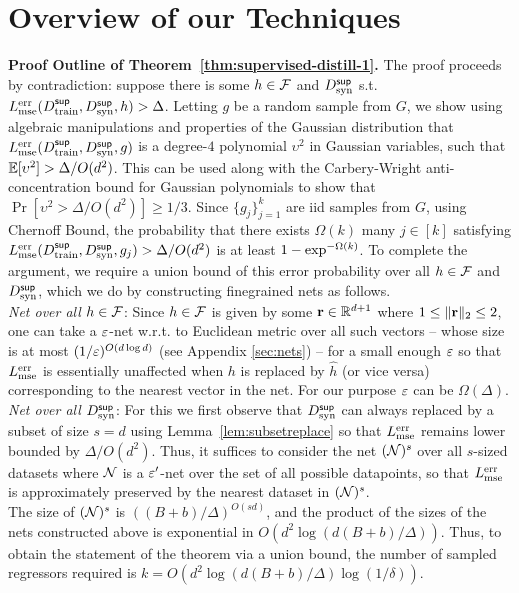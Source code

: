 \section{Overview of our Techniques}

{\bf Proof Outline of Theorem~\ref{thm:supervised-distill-1}.} The proof proceeds by contradiction: suppose there is some $h \in \mathcal{F}$ and $D^{\sf sup}_{\textnormal{syn}}$ s.t. $L^{\textnormal{err}}_{\textnormal{mse}}(D^{\sf sup}_{\textnormal{train}}, D^{\sf sup}_{\textnormal{syn}}, h) > \Delta$. Letting $g$ be a random sample from  $G$, we show  using algebraic manipulations and properties of the Gaussian distribution that  $L^{\textnormal{err}}_{\textnormal{mse}}(D^{\sf sup}_{\textnormal{train}}, D^{\sf sup}_{\textnormal{syn}}, g)$ is a degree-$4$ polynomial $\upsilon^2$ in Gaussian variables, such that $\mathbb{E}[\upsilon^2] > \Delta/O(d^2)$. This can be used along with the Carbery-Wright anti-concentration bound for Gaussian polynomials to show that $\Pr[\upsilon^2 > \Delta/O(d^2)] \geq 1/3$. Since $\{g_j\}_{j=1}^k$ are iid samples from $G$, using Chernoff Bound, the probability that there exists $\Omega(k)$ many $j \in [k]$ satisfying  $L^{\textnormal{err}}_{\textnormal{mse}}(D^{\sf sup}_{\textnormal{train}}, D^{\sf sup}_{\textnormal{syn}}, g_j) > \Delta/O(d^2)$ is at least $1 - \textnormal{exp}^{-\Omega(k)}$. To complete the argument, we require a union bound of this error probability over all $h \in \mathcal{F}$ and $D^{\sf sup}_{\textnormal{syn}}$, which we do by constructing finegrained nets as follows.\\
{\it Net over all $h \in \mathcal{F}$}: Since $h \in \mathcal{F}$ is given by some ${\mathbf{r}} \in \mathbb{R}^{d+1}$ where $1 \leq \|{\mathbf{r}}\|_2 \leq 2$, one can take a ${\varepsilon}$-net w.r.t. to Euclidean metric over all such vectors -- whose size is at most $(1/{\varepsilon})^{O(d\log d)}$ (see Appendix \ref{sec:nets}) -- for a small enough ${\varepsilon}$ so that $L^{\textnormal{err}}_{\textnormal{mse}}$ is essentially unaffected when $h$ is replaced by $\hat{h}$ (or vice versa) corresponding to the nearest vector in the net. For our purpose ${\varepsilon}$ can be $\Omega(\Delta)$. 
 \\
{\it Net over all $D^{\sf sup}_{\textnormal{syn}}$}: For this we first observe 
that $D^{\sf sup}_{\textnormal{syn}}$ can always replaced by a subset of size
$s = d$ using Lemma~\ref{lem:subsetreplace} so that
$L^{\textnormal{err}}_{\textnormal{mse}}$ remains lower bounded by $\Delta/O(d^2)$. Thus, it suffices to consider the net $(\mathcal{N})^{s}$ over all $s$-sized datasets where $\mathcal{N}$ is a  ${\varepsilon}'$-net over the set of all possible datapoints,  so that $L^{\textnormal{err}}_{\textnormal{mse}}$ is approximately preserved by the nearest dataset in $(\mathcal{N})^{s}$. \\
The size of $(\mathcal{N})^{s}$ is $((B+b)/\Delta)^{O(sd)}$, and the product of the sizes of the nets constructed above is exponential in $O\left(d^2\log(d(B+b)/\Delta)\right)$. Thus, to obtain the statement of the theorem via a union bound, the number of sampled regressors required is 
$k = O\left(d^2\log(d(B+b)/\Delta)\log(1/\delta)\right)$. 

